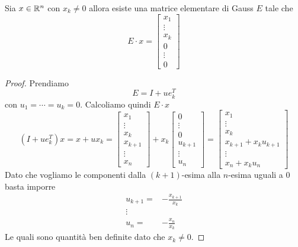 \begin{theorem}\label{th: eliminazione_gauss}
	Sia $x \in \mathbb{R}^n$ con $x_k \neq 0$ allora esiste una matrice elementare di Gauss $E$ tale che
	\[
		E \cdot x = \begin{bmatrix}
			x_1 \\ \vdots \\ x_k \\ 0 \\ \vdots \\ 0
		\end{bmatrix}
	\]
	\begin{proof}
		Prendiamo
		\[ E = I + u e_k^T \]
		con $u_1 = \cdots = u_k = 0$. Calcoliamo quindi $E \cdot x$
		\[
			(I + u e_k^T) x = x + u x_k =
			\begin{bmatrix}
				x_1 \\ \vdots \\ x_k \\ x_{k+1} \\ \vdots \\ x_n
			\end{bmatrix} + x_k
			\begin{bmatrix}
				0 \\ \vdots \\ 0 \\ u_{k+1} \\ \vdots \\ u_n
			\end{bmatrix} =
			\begin{bmatrix}
				x_1 \\ \vdots \\ x_k \\ x_{k+1} + x_k u_{k+1} \\ \vdots \\ x_n + x_k u_n
			\end{bmatrix}
		\]
		Dato che vogliamo le componenti dalla $(k+1)$-esima alla $n$-esima uguali a 0 basta imporre
		\begin{align*}
			u_{k+1} = & -\frac{x_{k+1}}{x_k} \\
			\vdots    &                      \\
			u_n =     & -\frac{x_n}{x_k}
		\end{align*}
		Le quali sono quantità ben definite dato che $x_k \neq 0$.
	\end{proof}
\end{theorem}

